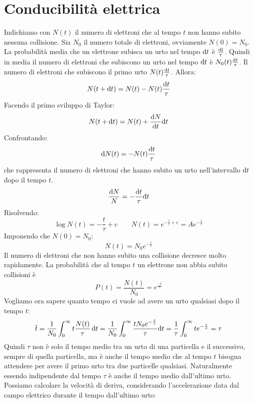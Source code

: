 \section{Conducibilità elettrica}
Indichiamo con $N(t)$ il numero di elettroni che al tempo $t$ non hanno subito nessuna collisione. Sia $N_0$ il numero totale di elettroni, ovviamente $N(0)=N_0$. La probabilità media che un elettrone subisca un urto nel tempo $\mathrm{d} t$ è $\frac{\mathrm{d} t}{\tau}$. Quindi in media il numero di elettroni che subiscono un urto nel tempo $\mathrm{d} t$ è $N_0(t)\frac{\mathrm{d} t}{\tau}$. Il numero di elettroni che subiscono il primo urto $N(t)\frac{\mathrm{d} t}{\tau}$. Allora:
\begin{equation*}N(t+\mathrm{d} t)=N(t)-N(t)\frac{\mathrm{d} t}{\tau}\end{equation*}
Facendo il primo sviluppo di Taylor:
\begin{equation*}N(t+\mathrm{d} t)=N(t)+\frac{\mathrm{d} N}{\mathrm{d} t}\mathrm{d} t\end{equation*}
Confrontando:
\begin{equation*}\mathrm{d} N(t)=-N(t)\frac{\mathrm{d} t}{\tau}\end{equation*}
che rappresenta il numero di elettroni che hanno subito un urto nell'intervallo $\mathrm{d} t$ dopo il tempo $t$.
\begin{equation*}\frac{\mathrm{d} N}{N}=-\frac{\mathrm{d} t}{\tau}\mathrm{d} t\end{equation*}
Risolvendo:
\begin{equation*}\log N(t)=-\frac{t}{\tau}+c \qquad N(t)=e^{-\frac{t}{\tau}+c}=Ae^{-\frac{t}{\tau}}\end{equation*}
Imponendo che $N(0)=N_0$:
\begin{equation*}N(t)=N_0e^{-\frac{t}{\tau}}\end{equation*}
Il numero di elettroni che non hanno subito una collisione decresce molto rapidamente. La probabilità che al tempo $t$ un elettrone non abbia subito collisioni è
\begin{equation*}P(t)=\frac{N(t)}{N_0}=e^{\frac{-t}{\tau}}\end{equation*}
Vogliamo ora sapere quanto tempo ci vuole ad avere un urto qualsiasi dopo il tempo $t$:
\begin{equation*}\overline{t}=\frac{1}{N_0}\int_0^\infty t\frac{N(t)}{\tau}\,\mathrm{d} t=\frac{1}{N_0}\int_0^\infty\frac{tN_0 e^{-\frac{t}{\tau}}}{\tau}\mathrm{d} t=\frac{1}{\tau}\int_0^\infty te^{-\frac{t}{\tau}}=\tau\end{equation*}
Quindi $\tau$ non è solo il tempo medio tra un urto di una particella e il successivo, sempre di quella particella, ma è anche il tempo medio che al tempo $t$ bisogna attendere per avere il primo urto tra due particelle qualsiasi. Naturalmente essendo indipendente dal tempo $\tau$ è anche il tempo medio dall'ultimo urto. Possiamo calcolare la velocità di deriva, considerando l'accelerazione data dal campo elettrico durante il tempo dall'ultimo urto:
